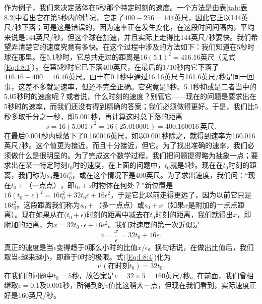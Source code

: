 作为例子，我们来决定落体在5秒那个特定时刻的速度。一个方法是由表\ref{tab:表8.2}中看出它在第5秒内的情况，它走了$400-256=144$英尺，因此它正以144英尺/秒下落；可是这是错误的，因为速率正在发生变化，在这段时间间隔内，平均来说是144英尺/秒，但这个球在加速，并且实际上走得比144英尺/秒要快。我们希望弄清楚它的速度究竟有多快。在这个过程中涉及的方法如下：我们知道在5秒时球在那里。在5.1秒时，它总共走过的距离是$16(5.1)^2=416.16$英尺（见式\ref{Eq:I:8:1}）。在第5秒时它已下落400英尺，在最后的$1/10$秒内它下落了$416.16-400=16.16$英尺。由于在0.1秒中通过16.16英尺与161.6英尺/秒是同一回事，这差不多就是速率，但还不完全正确。它究竟是5秒、5.1秒抑或是二者当中的5.05秒时的速度呢？或者说，什么时刻的速度？别管它——现在的问题是要求出在5秒时的速率，而我们还没有得到精确的答案；我们必须做得更好。于是，我们比5秒多取千分之一秒，即5.001秒，再计算这时总下落的距离
\begin{equation*}
s=16(5.001)^2=16(25.010001)=400.160016 \,\textrm{英尺}.
\end{equation*}
在最后0.001秒内球落下了0.160016英尺，如以0.001秒除之，就得到速率为160.016英尺/秒。这个值更为接近，而且十分接近，但它。为了找出准确的速率，我们必须做什么是很明显的。为了完成这个数学过程，我们把问题提得略为抽象一点；要求出在某一特定时刻$t_0$时的速度，在上面的问题中，$t_0$就是5秒。现在在$t_0$时刻的距离，我们称为$s_0$是$16t_0^2$，或在这个情况下是400英尺。为了求出速度，我们问：“现在$t_0+\textrm{（一点点）}$，即$t_0+s$时物体在何处？”新位置是$16(t_0+\epsilon)^2=16t_0^2+32t_0\epsilon+16\epsilon^2$，于是它比以前走得更远了，因为以前它只是$16t_0^2$。这段距离我们称为$s_0+\textrm{（多一点点）}$或$s_0+x$（如果$x$是附加的一点点距离）。现在如果从在($t_0+\epsilon$)时刻的距离中减去在$t_0$时刻的距离，我们就得出$x$，即附加的距离，为$x=32t_0\cdot\epsilon+16\epsilon^2$。我们对速度的第一次近似是
\begin{equation}
\label{Eq:I:8:4}
v=\frac{x}{\epsilon}=32t_0+16\epsilon.
\end{equation}
真正的速度是当$\epsilon$变得趋于0那么小时的比值$x/\epsilon$。换句话说，在做出比值后，我们取当$\epsilon$越来越小，即趋于0时的极限。式(\ref{Eq:I:8:4})化为
\begin{equation*}
v\,(\textrm{在时刻$t_0$})=32t_0.
\end{equation*}
在我们的问题中$t_0=5$秒，故答案是$v=32\times5=160$英尺/秒。在前面，我们曾相继取$\epsilon=0.1$及$0.001$秒，所得到的$v$值比这稍大一点，但现在我们看到，实际速度正好是160英尺/秒。




